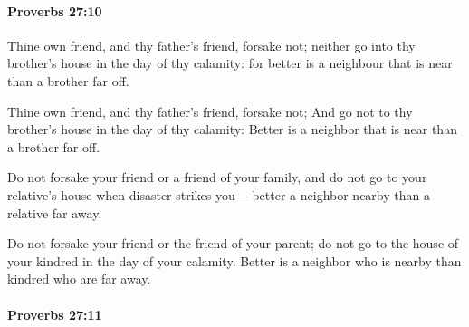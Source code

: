 		\paragraph{Proverbs 27:10} %
			\label{PROVERBS-27-10}

			Thine own friend, and thy father’s friend, forsake not; neither go into thy brother’s house in the day of thy calamity: for better is a neighbour that is near than a brother far off.

			\begin{versebox}
					\item[BHS] 
					\item[ASV] Thine own friend, and thy father's friend, forsake not; And go not to thy brother's house in the day of thy calamity: Better is a neighbor that is near than a brother far off.
					\item[NIV] Do not forsake your friend or a friend of your family, and do not go to your relative’s house when disaster strikes you— better a neighbor nearby than a relative far away.
					\item[NRSV] Do not forsake your friend or the friend of your parent; do not go to the house of your kindred in the day of your calamity. Better is a neighbor who is nearby than kindred who are far away.
			\end{versebox}

		\paragraph{Proverbs 27:11} %
			\label{PROVERBS-27-11}

